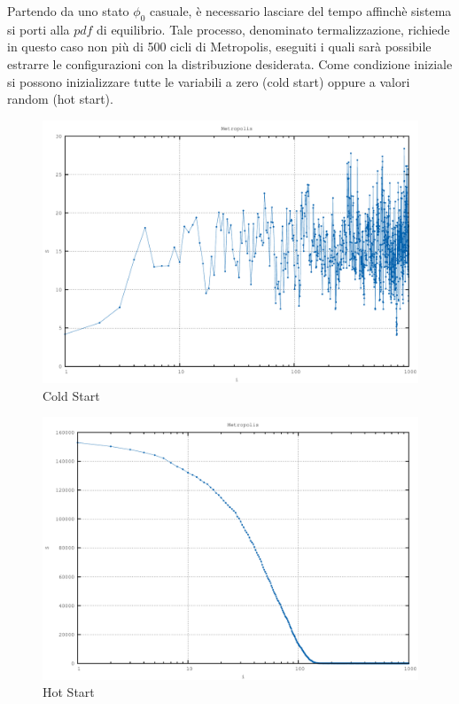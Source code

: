 Partendo da uno stato $\phi_0$ casuale, è necessario lasciare del tempo affinchè sistema si porti alla $pdf$ di equilibrio. Tale processo, denominato termalizzazione, richiede in questo caso non più di 500 cicli di Metropolis, eseguiti i quali sarà possibile estrarre le configurazioni con la distribuzione desiderata. Come condizione iniziale si possono inizializzare tutte le variabili a zero (cold start) oppure a valori random (hot start).
\begin{figure}[H]
\centering
\includegraphics[width=\textwidth]{action1}
\caption{Cold Start}
\label{fig:action1}
\end{figure}
\begin{figure}[H]
\centering
\includegraphics[width=\textwidth]{action2}
\caption{Hot Start}
\label{fig:action2}
\end{figure}

